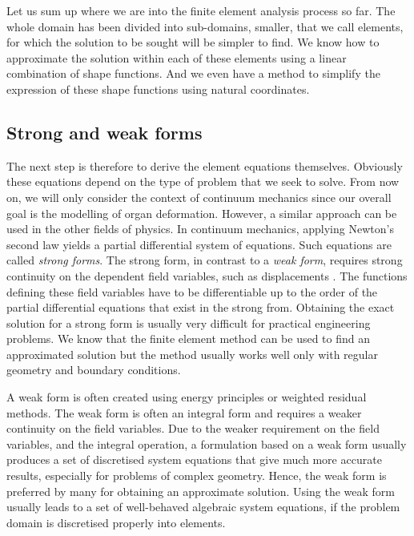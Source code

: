 Let us sum up where we are into the finite element analysis process so far. The whole domain has been divided into sub-domains, smaller, that we call elements, for which the solution to be sought will be simpler to find. We know how to approximate the solution within each of these elements using a linear combination of shape functions. And we even have a method to simplify the expression of these shape functions using natural coordinates. 

	\subsection{Strong and weak forms}
	
The next step is therefore to derive the element equations themselves. Obviously these equations depend on the type of problem that we seek to solve. From now on, we will only consider the context of continuum mechanics since our overall goal is the modelling of organ deformation. However, a similar approach can be used in the other fields of physics. In continuum mechanics, applying Newton's second law yields a partial differential system of equations. Such equations are called \emph{strong forms}. The strong form, in contrast to a \emph{weak form}, requires strong continuity on the dependent field variables, such as displacements \citep{Liu03}. The functions defining these field variables have to be differentiable up to the order of the partial differential equations that exist in the strong from. Obtaining the exact solution for a strong form is usually very difficult for practical engineering problems. We know that the finite element method can be used to find an approximated solution but the method usually works well only with regular geometry and boundary conditions.

A weak form is often created using energy principles or weighted residual methods. The weak form is often an integral form and requires a weaker continuity on the field variables. Due to the weaker requirement on the field variables, and the integral operation, a formulation based on a weak form usually produces a set of discretised system equations that give much more accurate results, especially for problems of complex geometry. Hence, the weak form is preferred by many for obtaining an approximate solution. Using the weak form usually leads to a set of well-behaved algebraic system equations, if the problem domain is discretised properly into elements.

